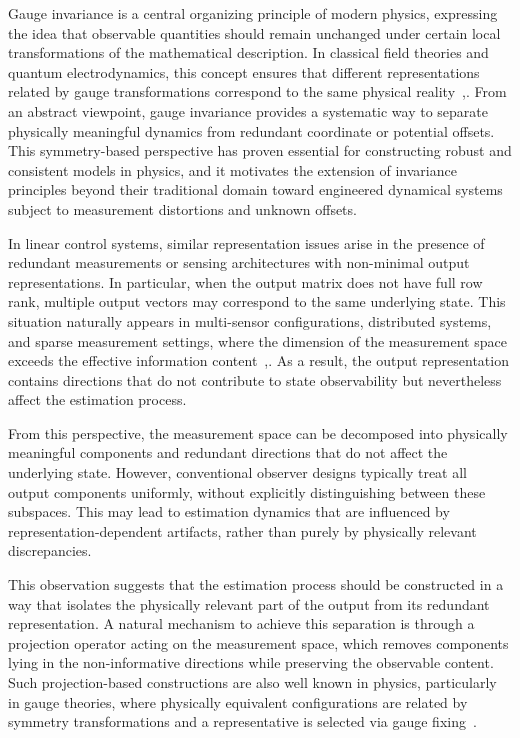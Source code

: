 \documentclass[twocolumn]{autart}    %
\begin{document}
Gauge invariance is a central organizing principle of modern physics, expressing the idea that observable quantities should remain unchanged under certain local transformations of the mathematical description. In classical field theories and quantum electrodynamics, this concept ensures that different representations related by gauge transformations correspond to the same physical reality~\cite{Peskin1995},\cite{YangMills1954}. From an abstract viewpoint, gauge invariance provides a systematic way to separate physically meaningful dynamics from redundant coordinate or potential offsets. This symmetry-based perspective has proven essential for constructing robust and consistent models in physics, and it motivates the extension of invariance principles beyond their traditional domain toward engineered dynamical systems subject to measurement distortions and unknown offsets.

In linear control systems, similar representation issues arise in the presence of redundant measurements or sensing architectures with non-minimal output representations. In particular, when the output matrix does not have full row rank, multiple output vectors may correspond to the same underlying state. This situation naturally appears in multi-sensor configurations, distributed systems, and sparse measurement settings, where the dimension of the measurement space exceeds the effective information content~\cite{Chen1999},\cite{Kailath1980}. As a result, the output representation contains directions that do not contribute to state observability but nevertheless affect the estimation process.

From this perspective, the measurement space can be decomposed into physically meaningful components and redundant directions that do not affect the underlying state. However, conventional observer designs typically treat all output components uniformly, without explicitly distinguishing between these subspaces. This may lead to estimation dynamics that are influenced by representation-dependent artifacts, rather than purely by physically relevant discrepancies.

This observation suggests that the estimation process should be constructed in a way that isolates the physically relevant part of the output from its redundant representation. A natural mechanism to achieve this separation is through a projection operator acting on the measurement space, which removes components lying in the non-informative directions while preserving the observable content. Such projection-based constructions are also well known in physics, particularly in gauge theories, where physically equivalent configurations are related by symmetry transformations and a representative is selected via gauge fixing~\cite{Peskin1995}.
\end{document}
